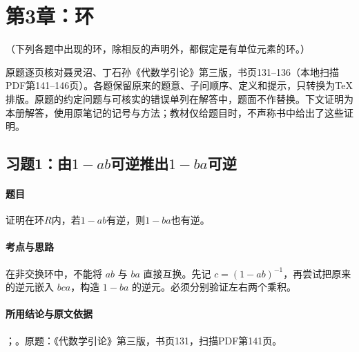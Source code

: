 

\clearpage\section{第3章：环}


\noindent（下列各题中出现的环，除相反的声明外，都假定是有单位元素的环。）

原题逐页核对聂灵沼、丁石孙《代数学引论》第三版，书页131--136（本地扫描PDF第141--146页）。各题保留原来的题意、子问顺序、定义和提示，只转换为TeX排版。原题的约定问题与可核实的错误单列在解答中，题面不作替换。下文证明为本册解答，使用原笔记的记号与方法；教材仅给题目时，不声称书中给出了这些证明。


\subsection{习题1：由\texorpdfstring{$1-ab$}{1-ab}可逆推出\texorpdfstring{$1-ba$}{1-ba}可逆}

\label{ex:3:1}

\paragraph{题目}

证明在环$R$内，若$1-ab$有逆，则$1-ba$也有逆。

\paragraph{考点与思路}

在非交换环中，不能将 $ab$ 与 $ba$ 直接互换。先记 $c=(1-ab)^{-1}$，再尝试把原来的逆元嵌入 $bca$，构造 $1-ba$ 的逆元。必须分别验证左右两个乘积。

\paragraph{所用结论与原文依据}

；。原题：《代数学引论》第三版，书页131，扫描PDF第141页。


